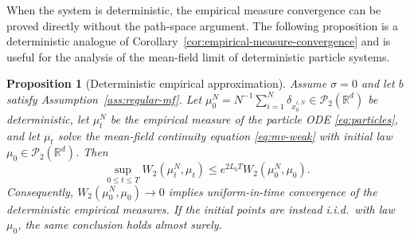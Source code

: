 \documentclass[11pt]{amsart}
\numberwithin{equation}{section}
\theoremstyle{plain}
\newtheorem{proposition}[theorem]{Proposition}
\newcommand{\R}{\mathbb{R}}
\newcommand{\cP}{\mathcal{P}}
\begin{document}
When the system is deterministic, the empirical measure convergence can be proved directly without the path-space argument.  The following proposition is a
deterministic analogue of Corollary~\ref{cor:empirical-measure-convergence} and is useful for the analysis of the mean-field limit of deterministic particle systems. 
\begin{proposition}[Deterministic empirical approximation]
\label{prop:deterministic-empirical-convergence}
 Assume $\sigma=0$ and let $b$ satisfy Assumption~\ref{ass:regular-mf}.  Let
$\mu_0^N=N^{-1}\sum_{i=1}^N\delta_{x_0^{i,N}}\in\cP_2(\R^d)$ be deterministic,
let $\mu_t^N$ be the empirical measure of the particle ODE
\eqref{eq:particles}, and let $\mu_t$ solve the mean-field continuity equation \eqref{eq:mv-weak} 
with initial law $\mu_0\in\cP_2(\R^d)$.  Then
\begin{equation}\label{eq:deterministic-empirical-stability}
 \sup_{0\leq t\leq T}W_2(\mu_t^N,\mu_t)
 \leq e^{2L_bT}W_2(\mu_0^N,\mu_0).
\end{equation}
Consequently, $W_2(\mu_0^N,\mu_0)\to0$ implies uniform-in-time convergence of
the deterministic empirical measures.  If the initial points are instead
i.i.d.\ with law $\mu_0$, the same conclusion holds almost surely.
\end{proposition}
\end{document}
